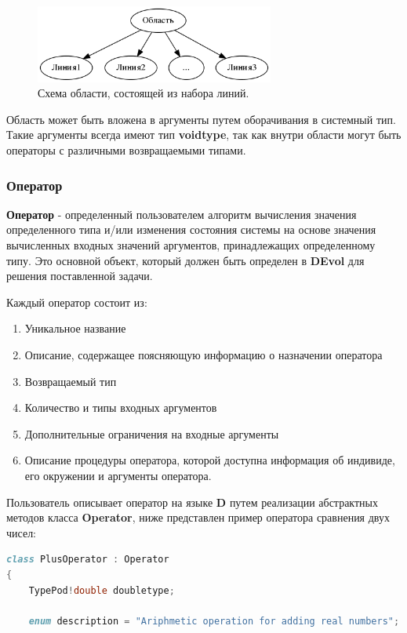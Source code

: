 \documentclass[russian,utf8,emptystyle]{eskdtext}
\begin{document}
\begin{spacing}{1.5}
\begin{figure}[h!]
\centering
\includegraphics[width=0.7\textwidth]{scope-example.png}
\caption{Схема области, состоящей из набора линий.}
\label{fig:line-example}
\end{figure}

Область может быть вложена в аргументы путем оборачивания в системный тип. Такие аргументы всегда имеют тип \textbf{voidtype}, так как внутри области могут быть операторы с различными возвращаемыми типами.

\subsubsection{Оператор}
\textbf{Оператор} - определенный пользователем алгоритм вычисления значения определенного типа и/или изменения состояния системы на основе значения вычисленных входных значений аргументов, принадлежащих определенному типу. Это основной объект, который должен быть определен в \textbf{DEvol} для решения поставленной задачи.

Каждый оператор состоит из:
\begin{enumerate}
\item Уникальное название
\item Описание, содержащее поясняющую информацию о назначении оператора
\item Возвращаемый тип
\item Количество и типы входных аргументов
\item Дополнительные ограничения на входные аргументы
\item Описание процедуры оператора, которой доступна информация об индивиде, его окружении и аргументы оператора.
\end{enumerate}

Пользователь описывает оператор на языке \textbf{D} путем реализации абстрактных методов класса \textbf{Operator}, ниже представлен пример оператора сравнения двух чисел:
\begin{lstlisting}[language=D]
class PlusOperator : Operator
{
    TypePod!double doubletype;
    
    enum description = "Ariphmetic operation for adding real numbers";
    

\end{lstlisting}
\end{spacing}
\end{document}
